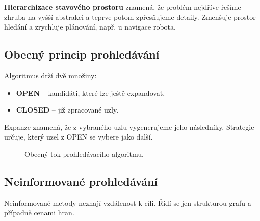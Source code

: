 \textbf{Hierarchizace stavového prostoru} znamená, že problém nejdříve řešíme zhruba na vyšší abstrakci a teprve potom zpřesňujeme detaily. Zmenšuje prostor hledání a zrychluje plánování, např. u navigace robota.

\subsection*{Obecný princip prohledávání}
Algoritmus drží dvě množiny:
\begin{itemize}
    \item \textbf{OPEN} -- kandidáti, které lze ještě expandovat,
    \item \textbf{CLOSED} -- již zpracované uzly.
\end{itemize}

Expanze znamená, že z vybraného uzlu vygenerujeme jeho následníky. Strategie
určuje, který uzel z OPEN se vybere jako další.

\begin{figure}[H]
    \centering
    \caption{Obecný tok prohledávacího algoritmu.}
\end{figure}

\subsection*{Neinformované prohledávání}
Neinformované metody neznají vzdálenost k cíli. Řídí se jen strukturou grafu a
případně cenami hran.

